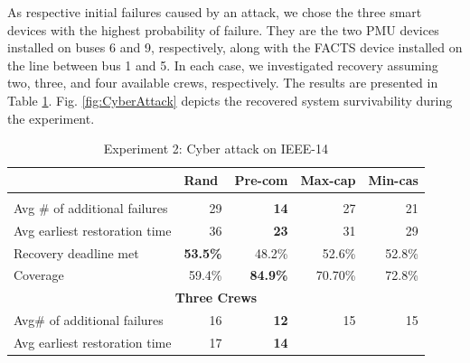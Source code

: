 \documentclass[conference]{IEEEtran}
\begin{document}
As respective initial failures caused by an attack, we chose the three smart devices with the highest probability of failure. They are the two PMU devices installed on buses 6 and 9, respectively, along with the FACTS device installed on the line between bus 1 and 5. In each case, we investigated recovery assuming two, three, and four available crews, respectively. The results are presented in Table \ref{TB:cyber}. Fig. \ref{fig:CyberAttack} depicts the recovered system survivability during the experiment.

\begin{table}[!htbp]
\centering
\caption{Experiment 2: Cyber attack on IEEE-14}
\label{TB:cyber}
\begin{tabular}{|lrrrr|}
\hline
\rowcolor[HTML]{D9D9D9} 
\multicolumn{1}{|l|}{\cellcolor[HTML]{D9D9D9}Recovery schemes} &
  \multicolumn{1}{l|}{\cellcolor[HTML]{D9D9D9}Rand} &
  \multicolumn{1}{l|}{\cellcolor[HTML]{D9D9D9}Pre-com} &
  \multicolumn{1}{l|}{\cellcolor[HTML]{D9D9D9}Max-cap} &
  \multicolumn{1}{l|}{\cellcolor[HTML]{D9D9D9}Min-cas} \\ \hline
\rowcolor[HTML]{FFFFFF} 
\multicolumn{5}{|c|}{\textbf{Two Crews}} \\ \hline
\multicolumn{1}{|l|}{\cellcolor[HTML]{D9D9D9}Avg \# of additional failures} &
  \multicolumn{1}{r|}{29} &
  \multicolumn{1}{r|}{\textbf{14}} &
  \multicolumn{1}{r|}{27} &
  21 \\ \hline
\multicolumn{1}{|l|}{\cellcolor[HTML]{D9D9D9}Avg earliest restoration time} &
  \multicolumn{1}{r|}{36} &
  \multicolumn{1}{r|}{\textbf{23}} &
  \multicolumn{1}{r|}{31} &
  29 \\ \hline
\multicolumn{1}{|l|}{\cellcolor[HTML]{D9D9D9}Recovery deadline met} &
  \multicolumn{1}{r|}{\textbf{53.5\%}} &
  \multicolumn{1}{r|}{48.2\%} &
  \multicolumn{1}{r|}{52.6\%} &
  52.8\% \\ \hline
\multicolumn{1}{|l|}{\cellcolor[HTML]{D9D9D9}Coverage} &
  \multicolumn{1}{r|}{59.4\%} &
  \multicolumn{1}{r|}{\textbf{84.9\%}} &
  \multicolumn{1}{r|}{70.70\%} &
  72.8\% \\ \hline
\multicolumn{5}{|c|}{\textbf{Three Crews}} \\ \hline
\multicolumn{1}{|l|}{\cellcolor[HTML]{D9D9D9}Avg\# of additional failures} &
  \multicolumn{1}{r|}{16} &
  \multicolumn{1}{r|}{\textbf{12}} &
  \multicolumn{1}{r|}{15} &
  15 \\ \hline
\multicolumn{1}{|l|}{\cellcolor[HTML]{D9D9D9}Avg earliest restoration time} &
  \multicolumn{1}{r|}{17} &
  \multicolumn{1}{r|}{\textbf{14}} &

\end{tabular}
\end{table}
\end{document}
